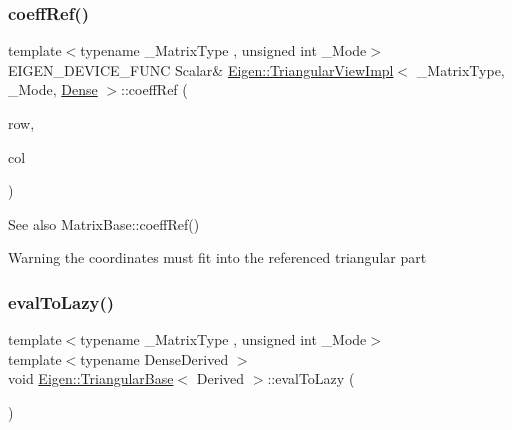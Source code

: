 \subsubsection{\texorpdfstring{coeffRef()}{coeffRef()}}
{\footnotesize\ttfamily template$<$typename \+\_\+\+Matrix\+Type , unsigned int \+\_\+\+Mode$>$ \\
E\+I\+G\+E\+N\+\_\+\+D\+E\+V\+I\+C\+E\+\_\+\+F\+U\+NC Scalar\& \mbox{\hyperlink{class_eigen_1_1_triangular_view_impl}{Eigen\+::\+Triangular\+View\+Impl}}$<$ \+\_\+\+Matrix\+Type, \+\_\+\+Mode, \mbox{\hyperlink{struct_eigen_1_1_dense}{Dense}} $>$\+::coeff\+Ref (\begin{DoxyParamCaption}\item[{\mbox{\hyperlink{struct_eigen_1_1_eigen_base_a554f30542cc2316add4b1ea0a492ff02}{Index}}}]{row,  }\item[{\mbox{\hyperlink{struct_eigen_1_1_eigen_base_a554f30542cc2316add4b1ea0a492ff02}{Index}}}]{col }\end{DoxyParamCaption})\hspace{0.3cm}{\ttfamily [inline]}}

\begin{DoxySeeAlso}{See also}
Matrix\+Base\+::coeff\+Ref() 
\end{DoxySeeAlso}
\begin{DoxyWarning}{Warning}
the coordinates must fit into the referenced triangular part 
\end{DoxyWarning}
\mbox{\label{class_eigen_1_1_triangular_view_impl_3_01___matrix_type_00_01___mode_00_01_dense_01_4_ab8db3e55eee50cdc56650b3498e235eb}} 
\subsubsection{\texorpdfstring{evalToLazy()}{evalToLazy()}}
{\footnotesize\ttfamily template$<$typename \+\_\+\+Matrix\+Type , unsigned int \+\_\+\+Mode$>$ \\
template$<$typename Dense\+Derived $>$ \\
void \mbox{\hyperlink{class_eigen_1_1_triangular_base}{Eigen\+::\+Triangular\+Base}}$<$ Derived $>$\+::eval\+To\+Lazy (\begin{DoxyParamCaption}\item[{typename Dense\+Derived}]{ }\end{DoxyParamCaption})}

